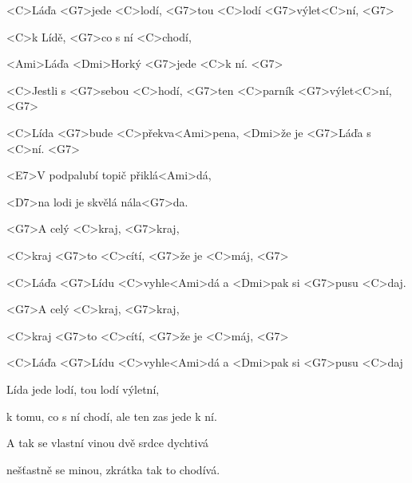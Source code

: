 
\zs
<C>Láďa <G7>jede <C>lodí, <G7>tou <C>lodí <G7>výlet<C>ní, <G7>

<C>k Lídě, <G7>co s ní <C>chodí,

<Ami>Láďa <Dmi>Horký <G7>jede <C>k ní. <G7>

<C>Jestli s <G7>sebou <C>hodí, <G7>ten <C>parník 
<G7>výlet<C>ní, <G7>

<C>Lída <G7>bude <C>překva<Ami>pena, <Dmi>že je 
<G7>Láďa s <C>ní. <G7>
\ks

\zr
<E7>V podpalubí topič přiklá<Ami>dá,

<D7>na lodi je skvělá nála<G7>da.

<G7>A celý <C>kraj, <G7>kraj,

<C>kraj <G7>to <C>cítí, <G7>že je <C>máj, <G7>

<C>Láďa <G7>Lídu <C>vyhle<Ami>dá a <Dmi>pak si 
<G7>pusu <C>daj.

<G7>A celý <C>kraj, <G7>kraj,

<C>kraj <G7>to <C>cítí, <G7>že je <C>máj, <G7>

<C>Láďa <G7>Lídu <C>vyhle<Ami>dá a <Dmi>pak si 
<G7>pusu <C>daj
\kr

\zs
Lída jede lodí, tou lodí výletní,

k tomu, co s ní chodí, ale ten zas jede k ní.

A tak se vlastní vinou dvě srdce dychtivá

nešťastně se minou, zkrátka tak to chodívá.
\ks

\zr \kr

\kp


















